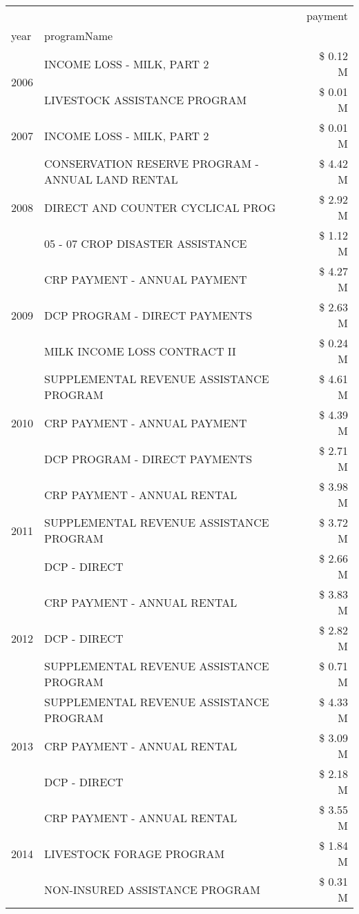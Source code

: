 \begin{tabular}{llr}
\toprule
 &  & payment \\
year & programName &  \\
\midrule
\multirow[t]{2}{*}{2006} & INCOME LOSS - MILK, PART 2 & \$ 0.12 M \\
 & LIVESTOCK ASSISTANCE PROGRAM & \$ 0.01 M \\
\cline{1-3}
2007 & INCOME LOSS - MILK, PART 2 & \$ 0.01 M \\
\cline{1-3}
\multirow[t]{3}{*}{2008} & CONSERVATION RESERVE PROGRAM - ANNUAL LAND RENTAL & \$ 4.42 M \\
 & DIRECT AND COUNTER CYCLICAL PROG & \$ 2.92 M \\
 & 05 - 07 CROP DISASTER ASSISTANCE & \$ 1.12 M \\
\cline{1-3}
\multirow[t]{3}{*}{2009} & CRP PAYMENT - ANNUAL PAYMENT & \$ 4.27 M \\
 & DCP PROGRAM - DIRECT PAYMENTS & \$ 2.63 M \\
 & MILK INCOME LOSS CONTRACT II & \$ 0.24 M \\
\cline{1-3}
\multirow[t]{3}{*}{2010} & SUPPLEMENTAL REVENUE ASSISTANCE PROGRAM & \$ 4.61 M \\
 & CRP PAYMENT - ANNUAL PAYMENT & \$ 4.39 M \\
 & DCP PROGRAM - DIRECT PAYMENTS & \$ 2.71 M \\
\cline{1-3}
\multirow[t]{3}{*}{2011} & CRP PAYMENT - ANNUAL RENTAL & \$ 3.98 M \\
 & SUPPLEMENTAL REVENUE ASSISTANCE PROGRAM & \$ 3.72 M \\
 & DCP - DIRECT & \$ 2.66 M \\
\cline{1-3}
\multirow[t]{3}{*}{2012} & CRP PAYMENT - ANNUAL RENTAL & \$ 3.83 M \\
 & DCP - DIRECT & \$ 2.82 M \\
 & SUPPLEMENTAL REVENUE ASSISTANCE PROGRAM & \$ 0.71 M \\
\cline{1-3}
\multirow[t]{3}{*}{2013} & SUPPLEMENTAL REVENUE ASSISTANCE PROGRAM & \$ 4.33 M \\
 & CRP PAYMENT - ANNUAL RENTAL & \$ 3.09 M \\
 & DCP - DIRECT & \$ 2.18 M \\
\cline{1-3}
\multirow[t]{3}{*}{2014} & CRP PAYMENT - ANNUAL RENTAL & \$ 3.55 M \\
 & LIVESTOCK FORAGE PROGRAM & \$ 1.84 M \\
 & NON-INSURED ASSISTANCE PROGRAM & \$ 0.31 M \\
\cline{1-3}

\end{tabular}
